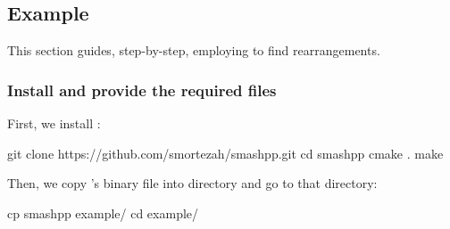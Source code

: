 \subsection{Example}
This section guides, step-by-step, employing \smashpp to find rearrangements.

\subsubsection*{Install \smashpp and provide the required files}
First, we install \smashpp:
\begin{code}[style=bash]
git clone https://github.com/smortezah/smashpp.git
cd smashpp
cmake .
make
\end{code}
Then, we copy \smashpp's binary file into  directory and go to that directory:
\begin{code}[style=bash]
cp smashpp example/
cd example/
\end{code}